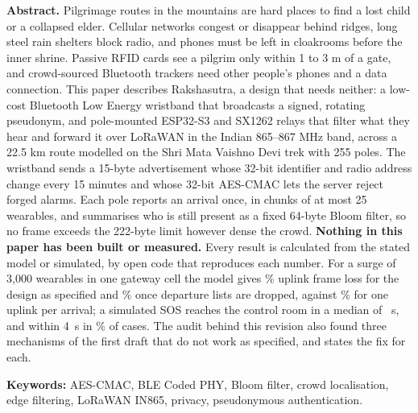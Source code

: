 \documentclass[11pt,a4paper]{article}
\begin{document}
{%
\par\vspace{7pt}
\vspace{9pt}
\par\vspace{8pt}
\thread\vspace{5pt}
\noindent\begin{minipage}{\textwidth}\small\setlength{\parindent}{0pt}
\textbf{Abstract.} Pilgrimage routes in the mountains are hard places to find a lost child or a collapsed elder. Cellular
networks congest or disappear behind ridges, long steel rain shelters block radio, and phones must be left in cloakrooms
before the inner shrine. Passive RFID cards see a pilgrim only within 1 to 3 m of a gate, and crowd-sourced Bluetooth
trackers need other people's phones and a data connection. This paper describes Rakshasutra, a design that needs neither:
a low-cost Bluetooth Low Energy wristband that broadcasts a signed, rotating pseudonym, and pole-mounted ESP32-S3 and
SX1262 relays that filter what they hear and forward it over LoRaWAN in the Indian 865--867 MHz band, across a
22.5 km route modelled on the Shri Mata Vaishno Devi trek with 255 poles. The wristband sends a 15-byte advertisement
whose 32-bit identifier and radio address change every 15 minutes and whose 32-bit AES-CMAC lets the server reject forged
alarms. Each pole reports an arrival once, in chunks of at most 25 wearables, and summarises who is still present as a
fixed 64-byte Bloom filter, so no frame exceeds the 222-byte limit however dense the crowd. \textbf{Nothing in this paper
has been built or measured.} Every result is calculated from the stated model or simulated, by open code that reproduces
each number. For a surge of 3,000 wearables in one gateway cell the model gives \LossRak\% uplink frame loss for the
design as specified and \LossRakNd\% once departure lists are dropped, against \LossSingle\% for one uplink per
arrival; a simulated SOS reaches the control room in a median of \SosMedian~s, and within 4~s in \SosFour\% of cases.
The audit behind this revision also found three mechanisms of the first draft that do not work as specified, and
states the fix for each.\par\vspace{3pt}
\textbf{Keywords:} AES-CMAC, BLE Coded PHY, Bloom filter, crowd localisation, edge filtering, LoRaWAN IN865, privacy,
pseudonymous authentication.
\end{minipage}\vspace{6pt}\thread\vspace{10pt}}
\end{document}
